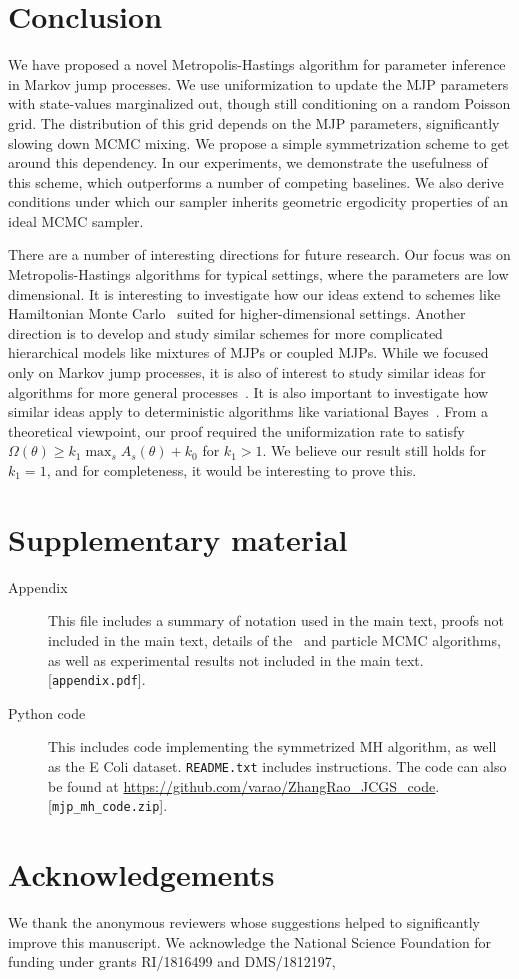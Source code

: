 \section{Conclusion}
We have proposed a novel Metropolis-Hastings algorithm for parameter 
inference in Markov jump processes. We use 
uniformization to update the MJP parameters with state-values marginalized 
out, though still conditioning on a random Poisson grid. The 
distribution of this grid depends on the MJP parameters, significantly 
slowing down MCMC mixing. We propose a simple symmetrization scheme to get 
around this dependency. In our experiments, we demonstrate the usefulness 
of this scheme, which outperforms a number of competing baselines.
We also derive conditions under which our sampler inherits geometric 
ergodicity properties of an ideal MCMC sampler.


There are a number of interesting directions for future research.
Our focus was on Metropolis-Hastings algorithms for typical settings,
where the parameters are low dimensional. It is interesting to 
investigate how our ideas extend to schemes like Hamiltonian Monte 
Carlo~\citep{Neal2010} suited for higher-dimensional settings. Another 
direction is to develop and study similar schemes for more complicated 
hierarchical models like mixtures of MJPs or coupled MJPs. While we 
focused only on Markov jump processes, it is also of interest to study 
similar ideas for algorithms for more general processes~\citep{RaoTeh12}. 
It is also important to investigate how similar ideas apply to 
deterministic algorithms like variational Bayes~\citep{OpperVarinf, panzharao17}. From 
a theoretical viewpoint, our proof required the uniformization rate to 
satisfy $\Omega(\theta) \ge k_1 \max_s A_s(\theta) + k_0$ for $k_1 > 1$. 
We believe our result still holds for $k_1 = 1$, and for completeness, 
it would be interesting to prove this.  


\section{Supplementary material}
\begin{description}
  \item[Appendix] This file includes a summary of notation used in the main text, proofs not included in the main text, details of the \naive\ and particle MCMC algorithms, as well as experimental results not included in the main text. [\texttt{appendix.pdf}]. 
\item[Python code] This includes code implementing the symmetrized MH algorithm, as well as the E Coli dataset.
  {\texttt{README.txt}} includes instructions. The code can also be found at {\url{https://github.com/varao/ZhangRao_JCGS_code}}.
 [\texttt{mjp\_mh\_code.zip}].
\end{description}

\section{Acknowledgements}
We thank the anonymous reviewers whose suggestions helped to significantly improve this manuscript.
We acknowledge the National Science Foundation for funding under grants RI/1816499 and DMS/1812197,


